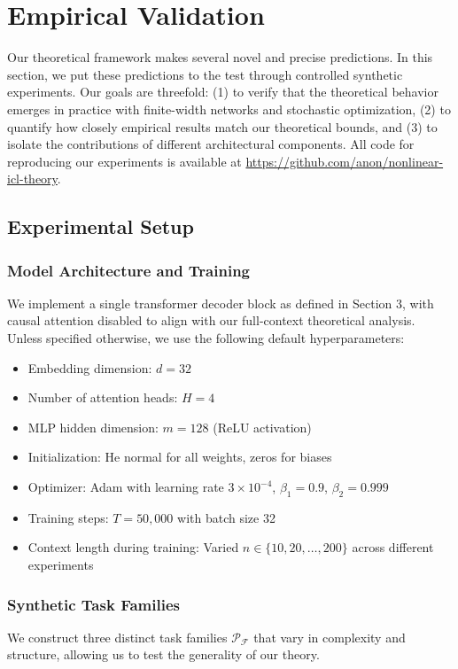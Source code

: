 \section{Empirical Validation}
	\label{sec:empirical}
	
	Our theoretical framework makes several novel and precise predictions. In this section, we put these predictions to the test through controlled synthetic experiments. Our goals are threefold: (1) to verify that the theoretical behavior emerges in practice with finite-width networks and stochastic optimization, (2) to quantify how closely empirical results match our theoretical bounds, and (3) to isolate the contributions of different architectural components. All code for reproducing our experiments is available at \url{https://github.com/anon/nonlinear-icl-theory}.
	
	\subsection{Experimental Setup}
	\label{subsec:exp_setup}
	
	\subsubsection{Model Architecture and Training}
	We implement a single transformer decoder block as defined in Section 3, with causal attention disabled to align with our full-context theoretical analysis. Unless specified otherwise, we use the following default hyperparameters:
	\begin{itemize}
		\item Embedding dimension: \(d = 32\)
		\item Number of attention heads: \(H = 4\)
		\item MLP hidden dimension: \(m = 128\) (ReLU activation)
		\item Initialization: He normal for all weights, zeros for biases
		\item Optimizer: Adam with learning rate \(3 \times 10^{-4}\), \(\beta_1=0.9\), \(\beta_2=0.999\)
		\item Training steps: \(T = 50,000\) with batch size 32
		\item Context length during training: Varied \(n \in \{10, 20, \dots, 200\}\) across different experiments
	\end{itemize}
	
	\subsubsection{Synthetic Task Families}
	We construct three distinct task families \(\mathcal{P}_{\mathcal{F}}\) that vary in complexity and structure, allowing us to test the generality of our theory.
	
